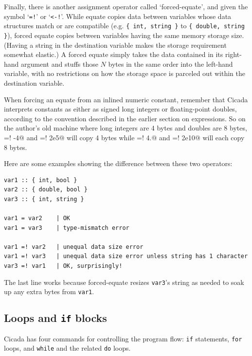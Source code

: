\documentclass{article}
\newenvironment{code}{
       \begin{list}{}{
               \setlength{\leftmargin}{.4in}
               \setlength{\rightmargin}{0in}
               \setlength{\topsep}{.2in}
       }
       \small
       \item[] }
       { \end{list}   }
\begin{document}
Finally, there is another assignment operator called `forced-equate', and given the symbol `\texttt{=!}' or `\verb#<-!#'.  While equate copies data between variables whose data structures match or are compatible (e.g. \verb#{ int, string }# to \verb#{ double, string }#), forced equate copies between variables having the same memory storage size.  (Having a string in the destination variable makes the storage requirement somewhat elastic.)  A forced equate simply takes the data contained in its right-hand argument and stuffs those $N$ bytes in the same order into the left-hand variable, with no restrictions on how the storage space is parceled out within the destination variable.

When forcing an equate from an inlined numeric constant, remember that Cicada interprets constants as either as signed long integers or floating-point doubles, according to the convention described in the earlier section on expressions.  So on the author's old machine where long integers are 4 bytes and doubles are 8 bytes, \verb@a =! -4@ and \verb@a =! 2e5@ will copy 4 bytes while \verb@a =! 4.@ and \verb@a =! 2e10@ will each copy 8 bytes.

Here are some examples showing the difference between these two operators:

\begin{code} \begin{verbatim}
var1 :: { int, bool }
var2 :: { double, bool }
var3 :: { int, string }

var1 = var2    | OK
var1 = var3    | type-mismatch error

var1 =! var2   | unequal data size error
var1 =! var3   | unequal data size error unless string has 1 character
var3 =! var1   | OK, surprisingly!
\end{verbatim} \end{code}

\noindent The last line works because forced-equate resizes \verb#var3#'s string as needed to soak up any extra bytes from \verb#var1#.






\subsection{Loops and \texttt{if} blocks} 

Cicada has four commands for controlling the program flow:  \texttt{if} statements, \texttt{for} loops, and \texttt{while} and the related \texttt{do} loops.
\end{document}
